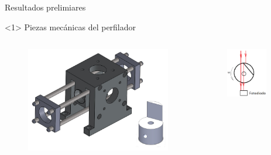 \begin{frame}{Resultados prelimiares}

    

    \begin{onlyenv}<1>
        Piezas mecánicas del perfilador
        \begin{columns}[c]
            \begin{column}{.6\textwidth}
                \begin{figure}
                    \centering
                    \includegraphics[width=\textwidth]{fig/perfilador/soporte_labo6}
                    \label{fig:pieza}
                \end{figure}
            \end{column}
            \begin{column}{0.4\textwidth}
                \centering
                \begin{figure}
                    \centering
                    \includegraphics[width=0.8\textwidth]{fig/perfilador/corte_tambor}

\end{figure}
\end{column}
\end{columns}
\end{onlyenv}
\end{frame}
